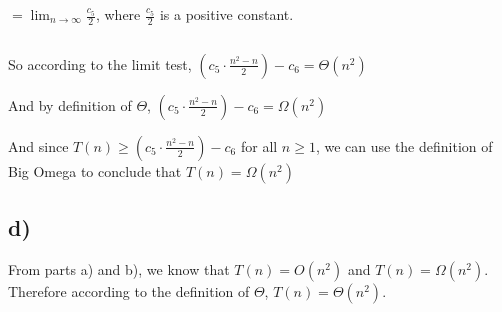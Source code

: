 \documentclass{article}
\begin{document}
$= \lim_{n\to\infty} \frac{c_5}{2}$, \;where $\frac{c_5}{2}$ is a positive constant.

\begin{lstlisting}

\end{lstlisting} 

So according to the limit test, $(c_5 \cdot \frac{n^2-n}{2}) - c_6 = \Theta(n^2)$

And by definition of $\Theta$, $(c_5 \cdot \frac{n^2-n}{2}) - c_6 = \Omega(n^2)$

And since $T(n) \geq (c_5 \cdot \frac{n^2-n}{2}) - c_6$ for all $n \geq 1$, we can use the definition of Big Omega to conclude that $T(n) = \Omega(n^2)$

\subsection*{d)} 
From parts a) and b), we know that $T(n) = O(n^2)$ and $T(n) = \Omega(n^2)$. Therefore according to the definition of $\Theta$, $T(n) = \Theta(n^2)$.
\end{document}
